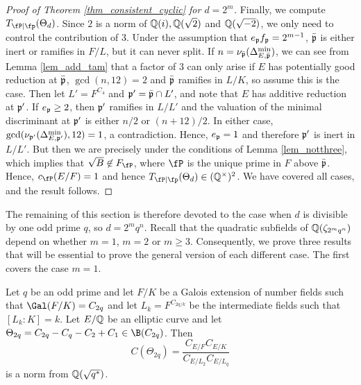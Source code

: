 \begin{proof}[Proof of Theorem \ref{thm_consistent_cyclic} for $d=2^m$]
    Finally, we compute $\Tp(\Theta_d)$. Since $2$ is a norm of $\mathbb{Q}(i),\mathbb{Q}(\sqrt{2})$ and $\mathbb{Q}(\sqrt{-2})$, we only need to control the contribution of $3$. Under the assumption that $e_{\mathfrak{p}} f_{\mathfrak{p}}=2^{m-1}$, $\bar{\mathfrak{p}}$ is either inert or ramifies in $F/L$, but it can never split. If $n=\nu_{\bar{\mathfrak{p}}}(\Delta_{E,\bar{\mathfrak{p}}}^{\min})$, we can see from Lemma \ref{lem_add_tam} that a factor of $3$ can only arise if $E$ has potentially good reduction at $\bar{\mathfrak{p}}$, $\gcd(n,12)=2$ and $\bar{\mathfrak{p}}$ ramifies in $L/K$, so assume this is the case. Then let $L'=F^{C_4}$ and $\mathfrak{p}'=\bar{\mathfrak{p}}\cap L'$, and note that $E$ has additive reduction at $\mathfrak{p}'$. If $e_{\mathfrak{p}}\geq 2$, then $\mathfrak{p}'$ ramifies in $L/L'$ and the valuation of the minimal discriminant at $\mathfrak{p}'$ is either $n/2$ or $(n+12)/2$. In either case, $\gcd(\nu_{\mathfrak{p}'}(\Delta_{E,\mathfrak{p}'}^{\min}),12)=1$, a contradiction. Hence, $e_{\mathfrak{p}}=1$ and therefore $\mathfrak{p}'$ is inert in $L/L'$. But then we are precisely under the conditions of Lemma \ref{lem_notthree}, which implies that $\sqrt{B}\not\in F_\fP$, where $\fP$ is the unique prime in $F$ above $\bar{\mathfrak{p}}$. Hence, $c_\fP(E/F)=1$ and hence $\Tp(\Theta_d)\in\QQss$. We have covered all cases, and the result follows.
\end{proof}

The remaining of this section is therefore devoted to the case when $d$ is divisible by one odd prime $q$, so $d=2^mq^n$. 
Recall that the quadratic subfields of $\mathbb{Q}(\zeta_{2^mq^n})$ depend on whether $m=1$, $m=2$ or $m\geq 3$. Consequently, we prove three results that will be essential to prove the general version of each different case. The first covers the case $m=1$.

\begin{lemma}\label{lem_C2p}
    Let $q$ be an odd prime and let $F/K$ be a Galois extension of number fields such that $\Gal(F/K)=C_{2q}$ and let $L_k=F^{C_{2q/k}}$ be the intermediate fields such that $[L_k:K]=k$. Let $E/\mathbb{Q}$ be an elliptic curve and let $\Theta_{2q}=C_{2q}-C_q-C_2+C_1\in \B(C_{2q})$. Then
    $$C(\Theta_{2q})=\frac{C_{E/F}C_{E/K}}{C_{E/L_2}C_{E/L_q}}$$
    is a norm from $\mathbb{Q}(\sqrt{q^*})$.
\end{lemma}

